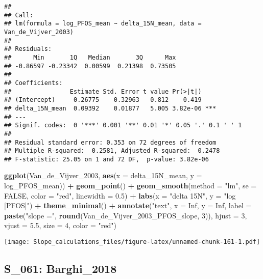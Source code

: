\documentclass[
]{article}
\newenvironment{Shaded}{\begin{snugshade}}{\end{snugshade}}
\newcommand{\AttributeTok}[1]{\textcolor[rgb]{0.13,0.29,0.53}{#1}}
\newcommand{\ConstantTok}[1]{\textcolor[rgb]{0.56,0.35,0.01}{#1}}
\newcommand{\DecValTok}[1]{\textcolor[rgb]{0.00,0.00,0.81}{#1}}
\newcommand{\FloatTok}[1]{\textcolor[rgb]{0.00,0.00,0.81}{#1}}
\newcommand{\FunctionTok}[1]{\textcolor[rgb]{0.13,0.29,0.53}{\textbf{#1}}}
\newcommand{\NormalTok}[1]{#1}
\newcommand{\SpecialCharTok}[1]{\textcolor[rgb]{0.81,0.36,0.00}{\textbf{#1}}}
\newcommand{\StringTok}[1]{\textcolor[rgb]{0.31,0.60,0.02}{#1}}
\begin{document}
\begin{verbatim}
## 
## Call:
## lm(formula = log_PFOS_mean ~ delta_15N_mean, data = Van_de_Vijver_2003)
## 
## Residuals:
##      Min       1Q   Median       3Q      Max 
## -0.86597 -0.23342  0.00599  0.21398  0.73505 
## 
## Coefficients:
##                Estimate Std. Error t value Pr(>|t|)    
## (Intercept)     0.26775    0.32963   0.812    0.419    
## delta_15N_mean  0.09392    0.01877   5.005 3.82e-06 ***
## ---
## Signif. codes:  0 '***' 0.001 '**' 0.01 '*' 0.05 '.' 0.1 ' ' 1
## 
## Residual standard error: 0.353 on 72 degrees of freedom
## Multiple R-squared:  0.2581, Adjusted R-squared:  0.2478 
## F-statistic: 25.05 on 1 and 72 DF,  p-value: 3.82e-06
\end{verbatim}

\begin{Shaded}
\begin{Highlighting}[]
\FunctionTok{ggplot}\NormalTok{(Van\_de\_Vijver\_2003, }\FunctionTok{aes}\NormalTok{(}\AttributeTok{x =}\NormalTok{ delta\_15N\_mean, }\AttributeTok{y =}\NormalTok{ log\_PFOS\_mean)) }\SpecialCharTok{+}
  \FunctionTok{geom\_point}\NormalTok{() }\SpecialCharTok{+}
  \FunctionTok{geom\_smooth}\NormalTok{(}\AttributeTok{method =} \StringTok{"lm"}\NormalTok{, }\AttributeTok{se =} \ConstantTok{FALSE}\NormalTok{, }\AttributeTok{color =} \StringTok{"red"}\NormalTok{, }\AttributeTok{linewidth =} \FloatTok{0.5}\NormalTok{) }\SpecialCharTok{+}
  \FunctionTok{labs}\NormalTok{(}\AttributeTok{x =} \StringTok{"delta 15N"}\NormalTok{,}
       \AttributeTok{y =} \StringTok{"log [PFOS]"}\NormalTok{) }\SpecialCharTok{+}
  \FunctionTok{theme\_minimal}\NormalTok{() }\SpecialCharTok{+}
  \FunctionTok{annotate}\NormalTok{(}\StringTok{"text"}\NormalTok{, }\AttributeTok{x =} \ConstantTok{Inf}\NormalTok{, }\AttributeTok{y =} \ConstantTok{Inf}\NormalTok{, }\AttributeTok{label =} \FunctionTok{paste}\NormalTok{(}\StringTok{"slope ="}\NormalTok{, }\FunctionTok{round}\NormalTok{(Van\_de\_Vijver\_2003\_PFOS\_slope, }\DecValTok{3}\NormalTok{)), }
           \AttributeTok{hjust =} \DecValTok{3}\NormalTok{, }\AttributeTok{vjust =} \FloatTok{5.5}\NormalTok{, }\AttributeTok{size =} \DecValTok{4}\NormalTok{, }\AttributeTok{color =} \StringTok{"red"}\NormalTok{)}
\end{Highlighting}
\end{Shaded}

\texttt{[image: Slope\_calculations\_files/figure-latex/unnamed-chunk-161-1.pdf]}

\subsection{S\_061: Barghi\_2018}\label{s_061-barghi_2018-1}
\end{document}
